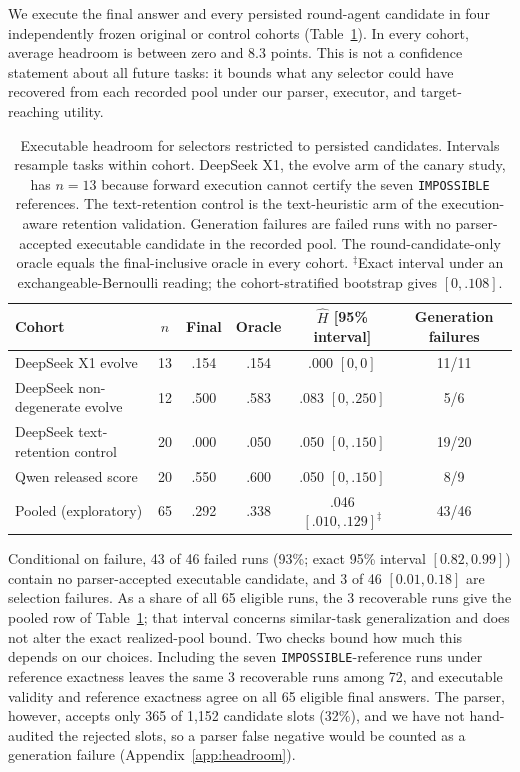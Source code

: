 \documentclass[11pt]{article}
\begin{document}
We execute the final answer and every persisted round-agent candidate in four independently frozen original or control cohorts (Table~\ref{tab:headroom}). In every cohort, average headroom is between zero and 8.3 points. This is not a confidence statement about all future tasks: it bounds what any selector could have recovered from each recorded pool under our parser, executor, and target-reaching utility.

\begin{table}[t]
\caption{Executable headroom for selectors restricted to persisted candidates. Intervals resample tasks within cohort. DeepSeek X1, the evolve arm of the canary study, has $n=13$ because forward execution cannot certify the seven \texttt{IMPOSSIBLE} references. The text-retention control is the text-heuristic arm of the execution-aware retention validation. Generation failures are failed runs with no parser-accepted executable candidate in the recorded pool. The round-candidate-only oracle equals the final-inclusive oracle in every cohort. $^\ddagger$Exact interval under an exchangeable-Bernoulli reading; the cohort-stratified bootstrap gives $[0,.108]$.}
\label{tab:headroom}
\centering
\small
\begin{tabular}{lccccc}
\toprule
Cohort & $n$ & Final & Oracle & $\widehat H$ [95\% interval] & Generation failures \\
\midrule
DeepSeek X1 evolve & 13 & .154 & .154 & .000 $[0,0]$ & 11/11 \\
DeepSeek non-degenerate evolve & 12 & .500 & .583 & .083 $[0,.250]$ & 5/6 \\
DeepSeek text-retention control & 20 & .000 & .050 & .050 $[0,.150]$ & 19/20 \\
Qwen released score & 20 & .550 & .600 & .050 $[0,.150]$ & 8/9 \\
\midrule
Pooled (exploratory) & 65 & .292 & .338 & .046 $[.010,.129]^\ddagger$ & 43/46 \\
\bottomrule
\end{tabular}
\end{table}

Conditional on failure, 43 of 46 failed runs (93\%; exact 95\% interval $[0.82,0.99]$) contain no parser-accepted executable candidate, and 3 of 46 $[0.01,0.18]$ are selection failures. As a share of all 65 eligible runs, the 3 recoverable runs give the pooled row of Table~\ref{tab:headroom}; that interval concerns similar-task generalization and does not alter the exact realized-pool bound. Two checks bound how much this depends on our choices. Including the seven \texttt{IMPOSSIBLE}-reference runs under reference exactness leaves the same 3 recoverable runs among 72, and executable validity and reference exactness agree on all 65 eligible final answers. The parser, however, accepts only 365 of 1,152 candidate slots (32\%), and we have not hand-audited the rejected slots, so a parser false negative would be counted as a generation failure (Appendix~\ref{app:headroom}).
\end{document}
